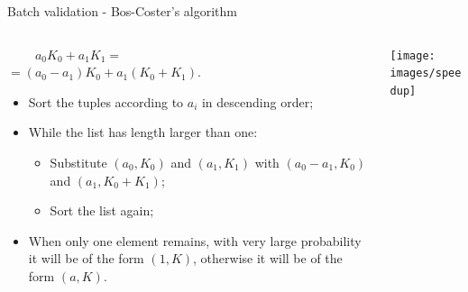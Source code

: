 \documentclass[slidescentered]{beamer}
\newcommand{\backupend}{
	\addtocounter{framenumberappendix}{-\value{framenumber}}
	\addtocounter{framenumber}{\value{framenumberappendix}} 
}
\begin{document}
	\begin{frame}{Batch validation - Bos-Coster's algorithm}
		\begin{columns}
			\begin{column}{0.5\linewidth}
				$\ \ \ \ \ \ \ \ \ \ a_0K_0 + a_1K_1 =$ \\ $= (a_0 - a_1)K_0 + a_1(K_0 + K_1)$.
				
				\bigskip
				
				\begin{itemize}
					\item Sort the tuples according to $a_i$ in descending order;
					\item While the list has length larger than one:
					\begin{itemize}
						\item Substitute $(a_0, K_0)$ and $(a_1, K_1)$ with $(a_0 - a_1, K_0)$ and $(a_1, K_0 + K_1)$;
						\item Sort the list again;
					\end{itemize}
					\item When only one element remains, with very large probability it will be of the form $(1, K)$, otherwise it will be of the form $(a, K)$.
				\end{itemize}
			\end{column}
			\begin{column}{0.5\linewidth}
				\hspace*{0cm}
				\texttt{[image: images/speedup]}
			\end{column}
		\end{columns}
	\end{frame}
	\backupend
\end{document}
